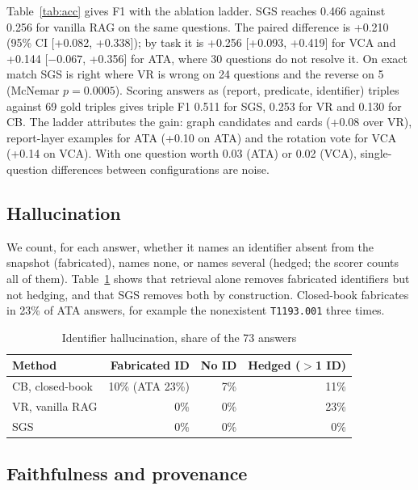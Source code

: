 \documentclass[conference]{IEEEtran}
\newcommand{\id}[1]{\texttt{#1}}
\begin{document}
Table~\ref{tab:acc} gives F1 with the ablation ladder. SGS reaches 0.466 against 0.256 for vanilla RAG on the same questions. The paired difference is +0.210 (95\% CI [+0.082, +0.338]); by task it is +0.256 [+0.093, +0.419] for VCA and +0.144 [$-0.067$, +0.356] for ATA, where 30 questions do not resolve it. On exact match SGS is right where VR is wrong on 24 questions and the reverse on 5 (McNemar $p=0.0005$). Scoring answers as (report, predicate, identifier) triples against 69 gold triples gives triple F1 0.511 for SGS, 0.253 for VR and 0.130 for CB. The ladder attributes the gain: graph candidates and cards (+0.08 over VR), report-layer examples for ATA (+0.10 on ATA) and the rotation vote for VCA (+0.14 on VCA). With one question worth 0.03 (ATA) or 0.02 (VCA), single-question differences between configurations are noise.

\subsection{Hallucination}

We count, for each answer, whether it names an identifier absent from the snapshot (fabricated), names none, or names several (hedged; the scorer counts all of them). Table~\ref{tab:hall} shows that retrieval alone removes fabricated identifiers but not hedging, and that SGS removes both by construction. Closed-book fabricates in 23\% of ATA answers, for example the nonexistent \id{T1193.001} three times.

\begin{table}[t]
\caption{Identifier hallucination, share of the 73 answers}
\label{tab:hall}
\centering
\footnotesize
\begin{tabular}{@{}l r r r@{}}
\toprule
Method & Fabricated ID & No ID & Hedged ($>$1 ID) \\
\midrule
CB, closed-book & 10\% (ATA 23\%) & 7\% & 11\% \\
VR, vanilla RAG & 0\% & 0\% & 23\% \\
SGS & 0\% & 0\% & 0\% \\
\bottomrule
\end{tabular}
\end{table}

\subsection{Faithfulness and provenance}
\end{document}
